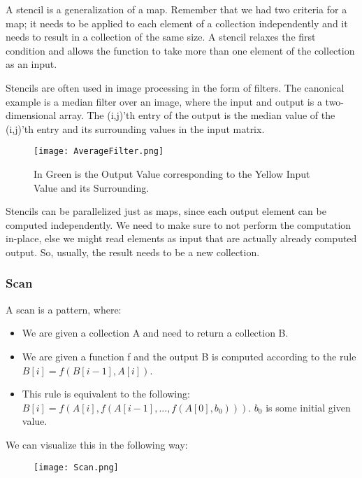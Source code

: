 \documentclass[main.tex]{subfiles}
\begin{document}
A stencil is a generalization of a map. Remember that we had two criteria for a map; it needs to be applied to each element of a collection independently and it needs to result in a collection of the same size. A stencil relaxes the first condition and allows the function to take more than one element of the collection as an input.

Stencils are often used in image processing in the form of filters. The canonical example is a median filter over an image, where the input and output is a two-dimensional array. The (i,j)'th entry of the output is the median value of the (i,j)'th entry and its surrounding values in the input matrix.

\begin{figure}[H]
    \centering
    \texttt{[image: AverageFilter.png]}
    \caption{In Green is the Output Value corresponding to the Yellow Input Value and its Surrounding.}
\end{figure}

Stencils can be parallelized just as maps, since each output element can be computed independently. We need to make sure to not perform the computation in-place, else we might read elements as input that are actually already computed output. So, usually, the result needs to be a new collection.


\subsubsection{Scan}
A scan is a pattern, where:

\begin{itemize}
  \item We are given a collection A and need to return a collection B.
  \item We are given a function f and the output B is computed according to the rule \(B[i] = f(B[i-1], A[i])\).
        \item This rule is equivalent to the following: \(B[i] = f(A[i], f(A[i-1], ... , f(A[0], b_{0})))\). \(b_{0}\) is some initial given value.
\end{itemize}

\noindent We can visualize this in the following way:

\begin{figure}[H]
    \centering
    \texttt{[image: Scan.png]}
\end{figure}
\end{document}

